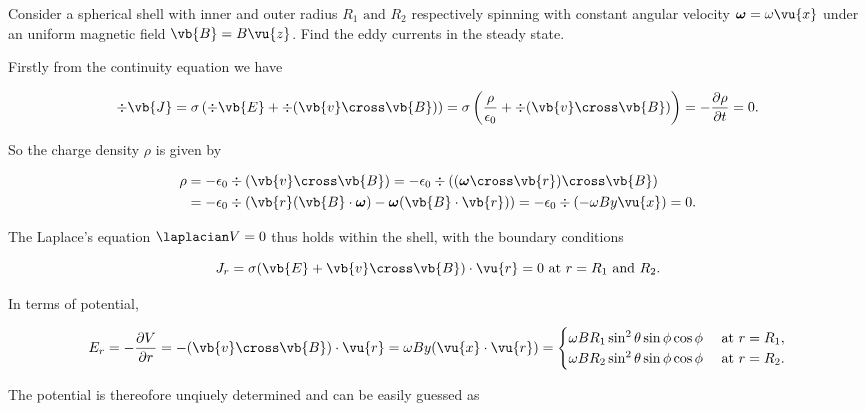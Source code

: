 \documentclass[english,a4paper,12pt]{report}
\begin{document}
{Consider a spherical shell with inner and outer radius \(R_1 \text { and } R_2 \) respectively spinning with constant angular velocity \(\boldsymbol{\omega } =  \omega \vu{x} \) under an uniform magnetic field \(\vb{B} = B \vu{z} \). Find the eddy currents in the steady state.  }
{Firstly from the continuity equation we have

\begin{equation}
    \div{\vb{J} } = \sigma \left( \div{\vb{E} } + \div{(\vb{v} \cross \vb{B} )}   \right) = \sigma \left( \frac{\rho }{\epsilon_0 } + \div{(\vb{v} \cross \vb{B} )}   \right) = -\frac{\partial \rho }{\partial t} = 0.
\end{equation}

So the charge density \(\rho \) is given by 

\begin{equation}
    \begin{aligned}
    \rho &= -\epsilon_0 \div{(\vb{v} \cross \vb{B} )} = -\epsilon_0 \div{((\boldsymbol{\omega } \cross \vb{r} )\cross \vb{B} )} \\ 
    &= -\epsilon_0 \div{(\vb{r} (\vb{B} \cdot \boldsymbol{\omega } ) - \boldsymbol{\omega }(\vb{B} \cdot \vb{r} ) )} =  - \epsilon_0 \div{(-\omega By \vu{x} )} = 0. 
    \end{aligned}
\end{equation}

The Laplace's equation \(\laplacian V = 0\) thus holds within the shell, with the boundary conditions

\begin{equation}
    J_{r} = \sigma (\vb{E} +\vb{v} \cross \vb{B} ) \cdot \vu{r} = 0 \text{ at } r=  R_1 \text { and } R_2 .  
\end{equation}

In terms of potential, 

\begin{equation}
    E_{r} = -\frac{\partial V}{\partial r} = -(\vb{v} \cross \vb{B} ) \cdot \vu{r} = \omega By(\vu{x} \cdot \vu{r} )= \begin{cases}
        \omega BR_1 \sin ^2\theta \sin \phi \cos \phi  &\text{ at } r = R_1 ,\\
        \omega BR_2 \sin ^2\theta \sin \phi \cos \phi  &\text{ at } r = R_2 .
    \end{cases} 
\end{equation}

The potential is thereofore unqiuely determined and can be easily guessed as 

}
\end{document}
